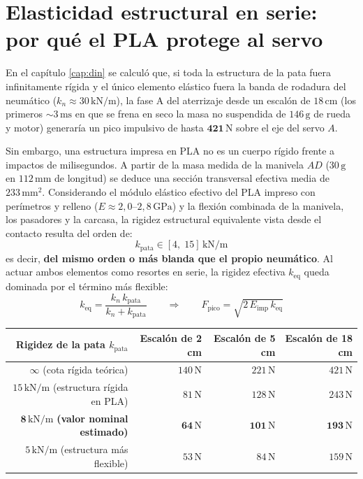 \documentclass[11pt,a4paper]{report}
\newcommand{\ud}[1]{\,\mathrm{#1}}
\begin{document}
\section{Elasticidad estructural en serie: por qué el PLA protege al servo}

En el capítulo \ref{cap:din} se calculó que, si toda la estructura de la pata fuera
infinitamente rígida y el único elemento elástico fuera la banda de rodadura del neumático
($k_n \approx 30\ud{kN/m}$), la fase A del aterrizaje desde un escalón de $18\ud{cm}$ (los
primeros $\sim 3\ud{ms}$ en que se frena en seco la masa no suspendida de $146\ud{g}$ de rueda y
motor) generaría un pico impulsivo de hasta $\mathbf{421\ud{N}}$ sobre el eje del servo $A$.

Sin embargo, una estructura impresa en PLA no es un cuerpo rígido frente a impactos de
milisegundos. A partir de la masa medida de la manivela $AD$ ($30\ud{g}$ en $112\ud{mm}$ de
longitud) se deduce una sección transversal efectiva media de $233\ud{mm^2}$. Considerando el
módulo elástico efectivo del PLA impreso con perímetros y relleno ($E \approx 2{,}0\text{--}2{,}8\ud{GPa}$)
y la flexión combinada de la manivela, los pasadores y la carcasa, la rigidez estructural
equivalente vista desde el contacto resulta del orden de:
\[
k_{\text{pata}} \in [4,\; 15]\ud{kN/m}
\]
es decir, \textbf{del mismo orden o más blanda que el propio neumático}. Al actuar ambos
elementos como resortes en serie, la rigidez efectiva $k_{\text{eq}}$ queda dominada por el
término más flexible:
\[
k_{\text{eq}} = \frac{k_n\,k_{\text{pata}}}{k_n + k_{\text{pata}}}
\qquad\Longrightarrow\qquad
F_{\text{pico}} = \sqrt{2\,E_{\text{imp}}\,k_{\text{eq}}}
\]

\begin{center}
\begin{tabular}{@{}rrrr@{}}
\toprule
\textbf{Rigidez de la pata $k_{\text{pata}}$} & \textbf{Escalón de 2 cm} & \textbf{Escalón de 5 cm} & \textbf{Escalón de 18 cm} \\
\midrule
$\infty$ (cota rígida teórica) & $140\ud{N}$ & $221\ud{N}$ & $421\ud{N}$ \\
$15\ud{kN/m}$ (estructura rígida en PLA) & $81\ud{N}$ & $128\ud{N}$ & $243\ud{N}$ \\
$\mathbf{8\ud{kN/m}}$ \textbf{(valor nominal estimado)} & $\mathbf{64\ud{N}}$ & $\mathbf{101\ud{N}}$ & $\mathbf{193\ud{N}}$ \\
$5\ud{kN/m}$ (estructura más flexible) & $53\ud{N}$ & $84\ud{N}$ & $159\ud{N}$ \\
\bottomrule
\end{tabular}
\end{center}
\end{document}
